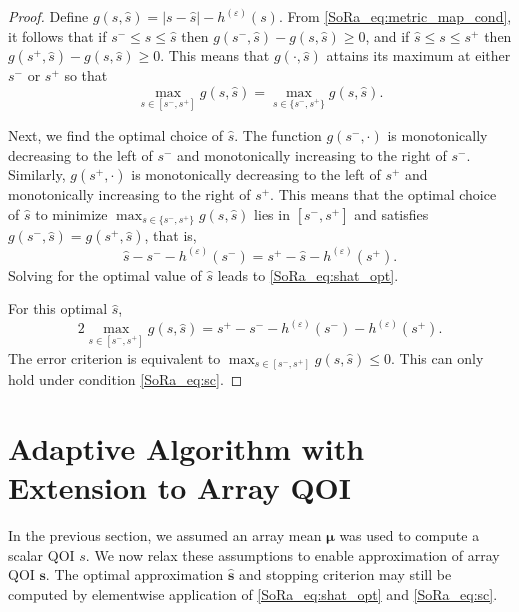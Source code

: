 \documentclass[graybox]{svmult}
\begin{document}
\begin{proof}
    Define $g(s,\hat{s})=\lvert s - \hat{s} \rvert -h^{(\varepsilon)}(s)$. From \eqref{SoRa_eq:metric_map_cond}, it follows that if  $s^- \leq s \leq \hat{s}$ then $g(s^-,\hat{s})-g(s,\hat{s}) \geq 0$, and if $\hat{s} \leq s \leq s^+$ then $g(s^+,\hat{s})-g(s,\hat{s})  \geq 0$. This means that $g(\cdot,\hat{s})$ attains its maximum at either $s^-$ or $s^+$ so that
    \begin{equation*}
        \max_{s \in [s^-,s^+]} g(s,\hat{s}) = \max_{s \in \{s^-,s^+\}} g(s,\hat{s}).
    \end{equation*}
    
    Next, we find the optimal choice of $\hat{s}$.  The function $g(s^-,\cdot)$ is monotonically decreasing to the left of  $s^-$ and monotonically increasing to the right of $s^-$. Similarly, $g(s^+,\cdot)$ is monotonically decreasing to the left of $s^+$ and monotonically increasing to the right of $s^+$. This means that the optimal choice of $\hat{s}$ to minimize $\max_{s \in \{s^-,s^+\}} g(s,\hat{s})$ lies in $[s^-,s^+]$ and satisfies $g(s^-,\hat{s}) = g(s^+,\hat{s})$, that is, 
    $$\hat{s} - s^- - h^{(\varepsilon)}(s^-) = s^+ - \hat{s} - h^{(\varepsilon)}(s^+).$$
    Solving for the optimal value of $\hat{s}$ leads to \eqref{SoRa_eq:shat_opt}.
    
    For this optimal $\hat{s}$, 
    $$2 \max_{s \in [s^-,s^+]} g(s,\hat{s}) =  s^+  -  s^-  - h^{(\varepsilon)}(s^-) - h^{(\varepsilon)}(s^+).$$
    The error criterion is equivalent to $\max_{s \in [s^-,s^+]} g(s,\hat{s}) \le 0 $.  This can only hold under condition  \eqref{SoRa_eq:sc}. 
\end{proof}

\section{Adaptive Algorithm with Extension to Array QOI} \label{SoRa_sec: Vectorized Implementation}

In the previous section, we assumed an array mean $\boldsymbol{\mu}$ was used to compute a scalar QOI $s$. We now relax these assumptions to enable approximation of array QOI $\boldsymbol{s}$. The optimal approximation $\hat{\boldsymbol{s}}$ and stopping criterion may still be computed by elementwise application of \eqref{SoRa_eq:shat_opt} and \eqref{SoRa_eq:sc}. 
\end{document}
